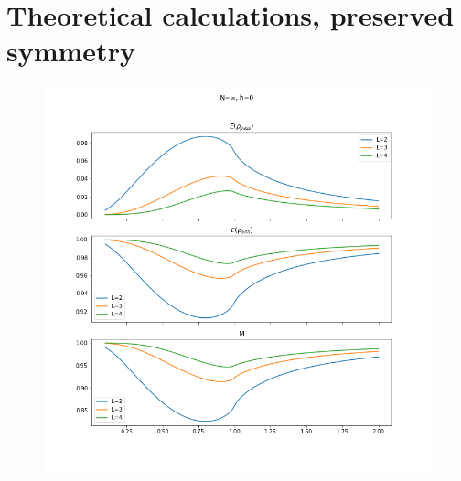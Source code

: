 \documentclass[12pt,a4paper]{article}
\begin{document}
	
	
	
	
	\clearpage
	\section{Theoretical calculations, preserved symmetry}
		\begin{figure}[h]
		\centering
		\includegraphics[width=\linewidth]{ergostheo}
		\caption{}
		\label{fig:ergostheo}
	\end{figure}	
	
\end{document}
